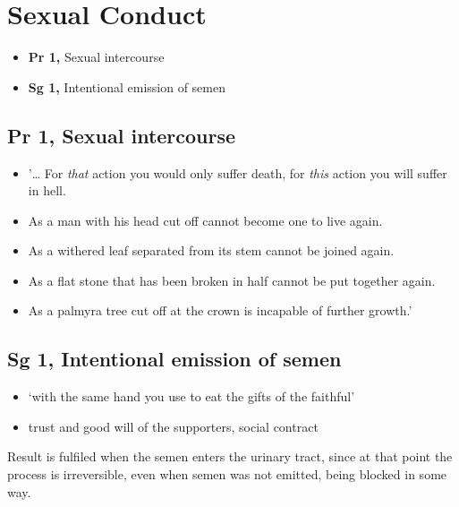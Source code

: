 \chapter{Sexual Conduct}

\begin{itemize}
\tightlist
\item
  \textbf{Pr 1,} Sexual intercourse
\item
  \textbf{Sg 1,} Intentional emission of semen
\end{itemize}

\section{Pr 1, Sexual intercourse}


\begin{itemize}
\tightlist
\item
  '\ldots{} For \emph{that} action you would only suffer death, for
  \emph{this} action you will suffer in hell.
\item
  As a man with his head cut off cannot become one to live again.
\item
  As a withered leaf separated from its stem cannot be joined again.
\item
  As a flat stone that has been broken in half cannot be put together
  again.
\item
  As a palmyra tree cut off at the crown is incapable of further
  growth.'
\end{itemize}

\clearpage

\section{Sg 1, Intentional emission of semen}


\begin{itemize}
\tightlist
\item
  `with the same hand you use to eat the gifts of the faithful'
\item
  trust and good will of the supporters, social contract
\end{itemize}

Result is fulfiled when the semen enters the urinary tract, since at
that point the process is irreversible, even when semen was not emitted,
being blocked in some way.

